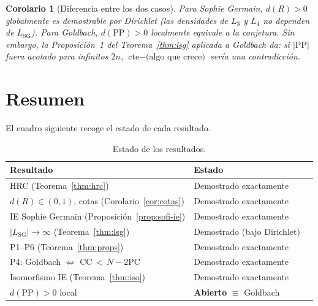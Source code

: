 \documentclass[11pt,a4paper]{article}
\newtheorem{corollary}[theorem]{Corolario}
\theoremstyle{definition}
\begin{document}
\begin{corollary}[Diferencia entre los dos casos]
Para Sophie Germain, $d(R)>0$ globalmente es demostrable por Dirichlet
(las densidades de $L_3$ y $L_4$ no dependen de $L_{\mathrm{SG}}$).
Para Goldbach, $d(\mathrm{PP})>0$ localmente equivale a la conjetura.
Sin embargo, la Proposición~1 del Teorema~\ref{thm:lsg} aplicada a
Goldbach da: si $|\mathrm{PP}|$ fuera acotado para infinitos $2n$,
$\text{cte}-\text{(algo que crece)}$ sería una contradicción.
\end{corollary}

\section{Resumen}

El cuadro siguiente recoge el estado de cada resultado.

\begin{table}[h]
\centering
\renewcommand{\arraystretch}{1.3}
\begin{tabular}{lll}
\toprule
\textbf{Resultado} & \textbf{Estado}\\
\midrule
HRC (Teorema~\ref{thm:hrc}) & Demostrado exactamente \\
$d(R)\in(0,1)$, cotas (Corolario~\ref{cor:cotas}) & Demostrado exactamente \\
IE Sophie Germain (Proposición~\ref{prop:sofi-ie}) & Demostrado exactamente \\
$|L_{\mathrm{SG}}|\to\infty$ (Teorema~\ref{thm:lsg}) & Demostrado (bajo Dirichlet) \\
P1--P6 (Teorema~\ref{thm:props}) & Demostrado exactamente \\
P4: Goldbach $\Leftrightarrow$ CC\,$<$\,$N-2$PC & Demostrado exactamente \\
Isomorfismo IE (Teorema~\ref{thm:iso}) & Demostrado exactamente \\
$d(\mathrm{PP})>0$ local & \textbf{Abierto} $\equiv$ Goldbach \\
\bottomrule
\end{tabular}
\caption{Estado de los resultados.}
\end{table}
\end{document}
